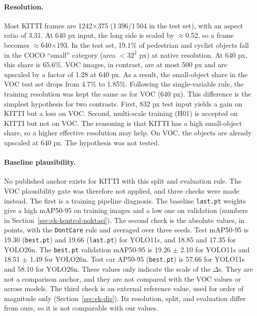 \paragraph{Resolution.}
Most KITTI frames are 1242$\times$375 (1\,396/1\,504 in the test set), with an aspect ratio of 3.31. At 640 px input, the long side is scaled by $\approx$0.52, so a frame becomes $\approx$640$\times$193. In the test set, 19.1\% of pedestrian and cyclist objects fall in the COCO ``small'' category (area $<32^2$ px) at native resolution. At 640 px, this share is 65.6\%. VOC images, in contrast, are at most 500 px and are upscaled by a factor of 1.28 at 640 px. As a result, the small-object share in the VOC test set drops from 4.7\% to 1.85\%. Following the single-variable rule, the training resolution was kept the same as for VOC (640 px). This difference is the simplest hypothesis for two contrasts. First, 832 px test input yields a gain on KITTI but a loss on VOC. Second, multi-scale training (H01) is accepted on KITTI but not on VOC. The reasoning is that KITTI has a high small-object share, so a higher effective resolution may help. On VOC, the objects are already upscaled at 640 px. The hypothesis was not tested.

\paragraph{Baseline plausibility.}
No published anchor exists for KITTI with this split and evaluation rule. The VOC plausibility gate was therefore not applied, and three checks were made instead. The first is a training pipeline diagnosis. The baseline \texttt{last.pt} weights give a high mAP50-95 on training images and a low one on validation (numbers in Section~\ref{sec:ek-kontrol-noktasi}). The second check is the absolute values, in points, with the \texttt{DontCare} rule and averaged over three seeds. Test mAP50-95 is 19.30 (\texttt{best.pt}) and 19.66 (\texttt{last.pt}) for YOLO11s, and 18.85 and 17.35 for YOLO26n. The \texttt{best.pt} validation mAP50-95 is 19.26 $\pm$ 2.10 for YOLO11s and 18.51 $\pm$ 1.49 for YOLO26n. Test car AP50-95 (\texttt{best.pt}) is 57.66 for YOLO11s and 58.10 for YOLO26n. These values only indicate the scale of the $\Delta$s. They are not a comparison anchor, and they are not compared with the VOC values or across models. The third check is an external reference value, used for order of magnitude only (Section~\ref{sec:ek-dis}). Its resolution, split, and evaluation differ from ours, so it is not comparable with our values.


